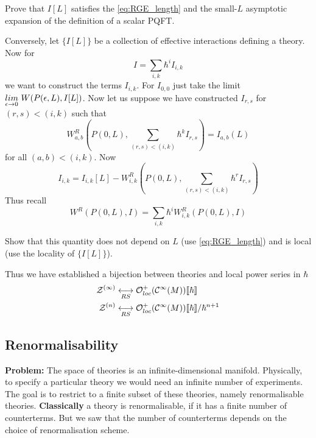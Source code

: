 \begin{ex}
  Prove that $I[L]$ satisfies the \eqref{eq:RGE_length} and the small-$L$ asymptotic expansion of the definition of a scalar PQFT.
\end{ex}

Conversely, let $\{I[L]\}$ be a collection of effective interactions defining a theory. Now for
\begin{equation} I = \sum_{i,k} \hbar^i I_{i,k}\end{equation}
we want to construct the terms $I_{i,k}$. For $I_{0,0}$ just take the limit $\limit{\epsilon \ra 0} \ W(P(\epsilon,L), I[L])$. Now let us suppose we have constructed $I_{r,s}$ for $(r,s)<(i,k)$ such that
\begin{equation} W^R_{a,b}\left(P(0,L), \sum_{(r,s)<(i,k)} \hbar^k I_{r,s}\right) = I_{a,b}(L)\end{equation}
for all $(a,b) < (i,k)$. Now
\begin{equation}I_{i,k} = I_{i,k}[L] - W^R_{i,k}\left(P(0,L), \sum_{(r,s)<(i,k)} \hbar^r I_{r,s} \right)\end{equation}
Thus recall
\begin{equation} W^R(P(0,L), I) = \sum_{i,k} \hbar^i W_{i,k}^R (P(0,L), I)\end{equation}

\begin{ex}
  Show that this quantity does not depend on $L$ (use \eqref{eq:RGE_length}) and is local (use the locality of $\{I[L]\}$).
\end{ex}

Thus we have established a bijection between theories and local power series in $\hbar$
\begin{align}
  \mathcal{Z}^{(\infty)} &\underset{RS}{\longleftrightarrow} \mathcal{O}^+_{loc}(\mathcal{C}^{\infty}(M))\llbracket \hbar \rrbracket \\
  \mathcal{Z}^{(n)} &\underset{RS}{\longleftrightarrow} \mathcal{O}^+_{loc}(\mathcal{C}^{\infty}(M))\llbracket \hbar \rrbracket / \hbar^{n+1}
\end{align}


\subsection{Renormalisability}

\textbf{Problem:} The space of theories is an infinite-dimensional manifold. Physically, to specify a particular theory we would need an infinite number of experiments.\\

The goal is to restrict to a finite subset of these theories, namely renormalisable theories. \textbf{Classically} a theory is renormalisable, if it has a finite number of counterterms. But we saw that the number of counterterms depends on the choice of renormalisation scheme.

